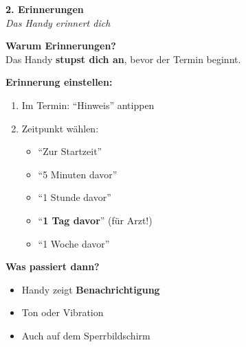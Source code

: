 \documentclass[a4paper,landscape,8pt]{extarticle}
\begin{document}
\hfill%
\begin{minipage}[t]{0.32\linewidth}
\begin{center}
\colorbox{remindergreen!15}{%
\begin{minipage}{0.95\linewidth}
\vspace{2mm}
\begin{center}
{\Large\bfseries\textcolor{remindergreen}{2. Erinnerungen}}\\[1pt]
{\footnotesize\itshape Das Handy erinnert dich}
\end{center}
\vspace{2mm}
\end{minipage}%
}
\end{center}

\vspace{1mm}

\textbf{Warum Erinnerungen?}\\
Das Handy \textbf{stupst dich an}, bevor der Termin beginnt.

\textbf{Erinnerung einstellen:}
\begin{enumerate}
\item Im Termin: ``Hinweis'' antippen
\item Zeitpunkt wählen:
\begin{itemize}
\item ``Zur Startzeit''
\item ``5 Minuten davor''
\item ``1 Stunde davor''
\item ``\textbf{1 Tag davor}'' (für Arzt!)
\item ``1 Woche davor''
\end{itemize}
\end{enumerate}

\textbf{Was passiert dann?}
\begin{itemize}
\item Handy zeigt \textbf{Benachrichtigung}
\item Ton oder Vibration
\item Auch auf dem Sperrbildschirm
\end{itemize}

\vspace{2mm}

\end{minipage}%
\end{document}
